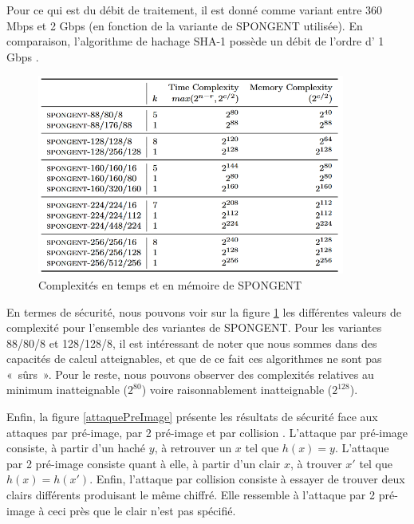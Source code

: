 			Pour ce qui est du débit de traitement, il est donné comme variant entre 360
		Mbps et 2 Gbps (en fonction de la variante de SPONGENT utilisée). En
		comparaison, l'algorithme de hachage SHA-1 possède un débit de l'ordre d' 1
		Gbps \cite{SHA1}.

		\begin{figure}[!h]
			\centering
			\includegraphics[width=0.9\textwidth]{imgs/Spongent/timeComplexity.png}
			\caption{Complexités en temps et en mémoire de SPONGENT}
			\label{timeComplexity}
		\end{figure}

			En termes de sécurité, nous pouvons voir sur la figure \ref{timeComplexity}
		les différentes valeurs de complexité pour l'ensemble des variantes de
		SPONGENT. Pour les variantes 88/80/8 et 128/128/8, il est intéressant de
		noter que nous sommes dans des capacités de calcul atteignables, et que de
		ce fait ces algorithmes ne sont pas « sûrs ». Pour le reste, nous pouvons
		observer des complexités relatives au minimum inatteignable ($2^{80}$) voire
		raisonnablement inatteignable ($2^{128}$).

			Enfin, la figure \ref{attaquePreImage} présente les résultats de sécurité
		face aux attaques par pré-image, par 2 pré-image et par collision
		\cite{googleSpongent}. L'attaque par pré-image consiste, à partir d'un haché
		$y$, à retrouver un $x$ tel que $h(x) = y$. L'attaque par 2
		pré-image consiste quant à elle, à partir d'un clair $x$, à trouver $x'$ tel
		que $h(x) = h(x')$. Enfin, l'attaque par collision consiste à essayer de
		trouver deux clairs différents produisant le même chiffré. Elle ressemble à
		l'attaque par 2 pré-image à ceci près que le clair n'est pas
		spécifié.

